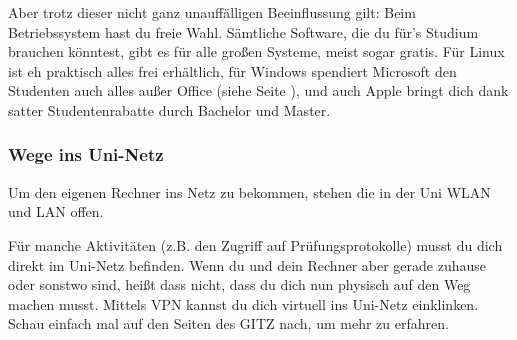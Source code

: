 			Aber trotz dieser nicht ganz unauffälligen Beeinflussung gilt: Beim Betriebssystem hast du freie Wahl. Sämtliche Software, die du für's Studium brauchen  könntest, gibt es für alle großen Systeme, meist sogar gratis. Für Linux ist eh  praktisch alles frei erhältlich, für Windows spendiert Microsoft den Studenten auch alles außer Office (siehe Seite \pageref{msdnaa}), und auch Apple bringt dich dank satter Studentenrabatte durch Bachelor und Master. 

		\subsubsection{Wege ins Uni-Netz}
			Um den eigenen Rechner ins Netz zu bekommen, stehen die in der Uni WLAN und LAN offen.

			Für manche Aktivitäten (z.B. den Zugriff auf Prüfungsprotokolle) musst du dich direkt im Uni-Netz befinden. Wenn du und dein Rechner aber gerade zuhause oder sonstwo sind, heißt dass nicht, dass du dich nun physisch auf den Weg machen musst. Mittels VPN kannst du dich virtuell ins Uni-Netz einklinken. Schau einfach mal auf den Seiten des GITZ nach, um mehr zu erfahren.
